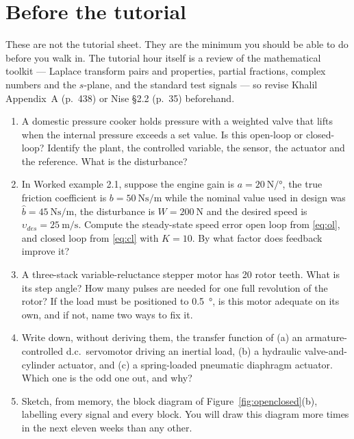 \documentclass[11pt,a4paper]{article}
\begin{document}
\section*{Before the tutorial}

These are not the tutorial sheet. They are the minimum you should be able to do
before you walk in. The tutorial hour itself is a review of the mathematical
toolkit --- Laplace transform pairs and properties, partial fractions, complex
numbers and the $s$-plane, and the standard test signals --- so revise
Khalil Appendix~A (p.~438) or Nise \S2.2 (p.~35) beforehand.

\begin{enumerate}[leftmargin=*]
\item A domestic pressure cooker holds pressure with a weighted valve that
      lifts when the internal pressure exceeds a set value. Is this open-loop
      or closed-loop? Identify the plant, the controlled variable, the sensor,
      the actuator and the reference. What is the disturbance?

\item In Worked example 2.1, suppose the engine gain is
      $a=\SI{20}{\newton\per\degree}$, the true friction coefficient is
      $b=\SI{50}{\newton\second\per\metre}$ while the nominal value used in
      design was $\hat b=\SI{45}{\newton\second\per\metre}$, the disturbance is
      $W=\SI{200}{\newton}$ and the desired speed is
      $\upsilon_{des}=\SI{25}{\metre\per\second}$. Compute the steady-state
      speed error open loop from \eqref{eq:ol}, and closed loop from
      \eqref{eq:cl} with $K=10$. By what factor does feedback improve it?

\item A three-stack variable-reluctance stepper motor has 20 rotor teeth. What
      is its step angle? How many pulses are needed for one full revolution of
      the rotor? If the load must be positioned to \SI{0.5}{\degree}, is this
      motor adequate on its own, and if not, name two ways to fix it.

\item Write down, without deriving them, the transfer function of (a) an
      armature-controlled d.c.\ servomotor driving an inertial load, (b) a
      hydraulic valve-and-cylinder actuator, and (c) a spring-loaded pneumatic
      diaphragm actuator. Which one is the odd one out, and why?

\item Sketch, from memory, the block diagram of Figure~\ref{fig:openclosed}(b),
      labelling every signal and every block. You will draw this diagram more
      times in the next eleven weeks than any other.
\end{enumerate}
\end{document}
